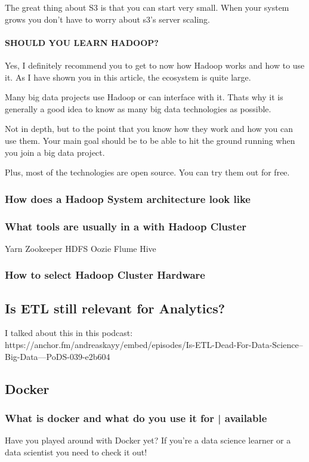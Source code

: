 \documentclass[12pt]{scrartcl} %
\begin{document}
The great thing about S3 is that you can start very small. When your system grows you don’t have to worry about s3’s server scaling.

\paragraph{SHOULD YOU LEARN HADOOP? }

Yes, I definitely recommend you to get to now how Hadoop works and how to use it. As I have shown you in this article, the ecosystem is quite large.

Many big data projects use Hadoop or can interface with it. Thats why it is generally a good idea to know as many big data technologies as possible.

Not in depth, but to the point that you know how they work and how you can use them. Your main goal should be to be able to hit the ground running when you join a big data project.

Plus, most of the technologies are open source. You can try them out for free.
\subsubsection{How does a Hadoop System architecture look like}
\subsubsection{What tools are usually in a with Hadoop Cluster} 
Yarn 
Zookeeper 
HDFS 
Oozie 
Flume
Hive
\subsubsection{How to select Hadoop Cluster Hardware} 
 
\subsection{Is ETL still relevant for Analytics?}
I talked about this in this podcast: https://anchor.fm/andreaskayy/embed/episodes/Is-ETL-Dead-For-Data-Science--Big-Data---PoDS-039-e2b604
 
 
\subsection{Docker}

\subsubsection{What is docker and what do you use it for | available}
Have you played around with Docker yet? If you’re a data science learner or a data scientist you need to check it out!
\end{document}
